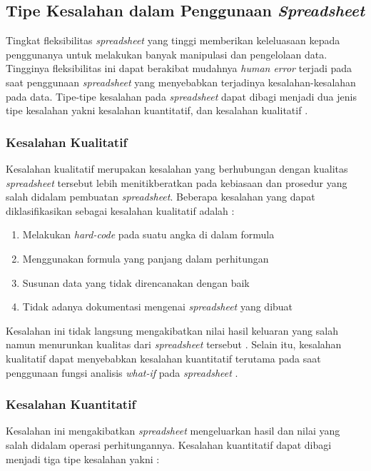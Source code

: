 \subsection{Tipe Kesalahan dalam Penggunaan \textit{Spreadsheet}} \label{KesalahanPenggunaan}
Tingkat fleksibilitas \textit{spreadsheet} yang tinggi memberikan keleluasaan kepada penggunanya untuk melakukan banyak manipulasi dan pengelolaan data. Tingginya fleksibilitas ini dapat berakibat mudahnya \textit{human error} terjadi pada saat penggunaan \textit{spreadsheet} yang menyebabkan terjadinya kesalahan-kesalahan pada data. Tipe-tipe kesalahan pada \textit{spreadsheet} dapat dibagi menjadi dua jenis tipe kesalahan yakni kesalahan kuantitatif, dan kesalahan kualitatif \citep{Panko1998}. 

    \subsubsection{Kesalahan Kualitatif}
    Kesalahan kualitatif merupakan kesalahan yang berhubungan dengan kualitas \textit{spreadsheet} tersebut lebih menitikberatkan pada kebiasaan dan prosedur yang salah didalam pembuatan \textit{spreadsheet}. Beberapa kesalahan yang dapat diklasifikasikan sebagai kesalahan kualitatif adalah \citep{Powell2009}:

    \begin{enumerate}
        \item Melakukan \textit{hard-code} pada suatu angka di dalam formula
        \item Menggunakan formula yang panjang dalam perhitungan
        \item Susunan data yang tidak direncanakan dengan baik
        \item Tidak adanya dokumentasi mengenai \textit{spreadsheet} yang dibuat
    \end{enumerate}

    Kesalahan ini tidak langsung mengakibatkan nilai hasil keluaran yang salah namun menurunkan kualitas dari \textit{spreadsheet} tersebut \citep{Rajalingham2001}. Selain itu, kesalahan kualitatif dapat menyebabkan kesalahan kuantitatif terutama pada saat penggunaan fungsi analisis \textit{what-if} pada \textit{spreadsheet} \citep{Panko1998}.

    \subsubsection{Kesalahan Kuantitatif}
    Kesalahan ini mengakibatkan \textit{spreadsheet} mengeluarkan hasil dan nilai yang salah didalam operasi perhitungannya. Kesalahan kuantitatif dapat dibagi menjadi tiga tipe kesalahan yakni \citep{Panko1998}:

